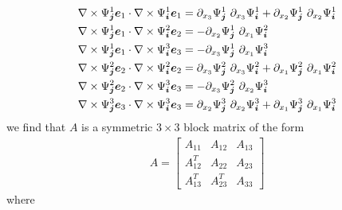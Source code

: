 \begin{align*}
 \nabla \times \Psi^{1}_{\bm{j}} \bm{e}_{1} \cdot \nabla \times \Psi^{1}_{\bm{i}} \bm{e}_{1} &=  
    \partial_{x_3} \Psi^{1}_{\bm{j}} ~ \partial_{x_3} \Psi^{1}_{\bm{i}} 
  + \partial_{x_2} \Psi^{1}_{\bm{j}} ~ \partial_{x_2} \Psi^{1}_{\bm{i}}
 \\
 \nabla \times \Psi^{1}_{\bm{j}} \bm{e}_{1} \cdot \nabla \times \Psi^{2}_{\bm{i}} \bm{e}_{2} &= 
 - \partial_{x_2} \Psi^{1}_{\bm{j}} ~ \partial_{x_1} \Psi^{2}_{\bm{i}}
 \\
 \nabla \times \Psi^{1}_{\bm{j}} \bm{e}_{1} \cdot \nabla \times \Psi^{3}_{\bm{i}} \bm{e}_{3} &=  
 - \partial_{x_3} \Psi^{1}_{\bm{j}} ~ \partial_{x_1} \Psi^{3}_{\bm{i}}
 \\
 \nabla \times \Psi^{2}_{\bm{j}} \bm{e}_{2} \cdot \nabla \times \Psi^{2}_{\bm{i}} \bm{e}_{2} &= 
   \partial_{x_3} \Psi^{2}_{\bm{j}} ~ \partial_{x_3} \Psi^{2}_{\bm{i}} 
 + \partial_{x_1} \Psi^{2}_{\bm{j}} ~ \partial_{x_1} \Psi^{2}_{\bm{i}}
 \\
 \nabla \times \Psi^{2}_{\bm{j}} \bm{e}_{2} \cdot \nabla \times \Psi^{3}_{\bm{i}} \bm{e}_{3} &=  
 - \partial_{x_3} \Psi^{2}_{\bm{j}} ~  \partial_{x_2} \Psi^{3}_{\bm{i}} 
 \\
 \nabla \times \Psi^{3}_{\bm{j}} \bm{e}_{3} \cdot \nabla \times \Psi^{3}_{\bm{i}} \bm{e}_{3} &=  
   \partial_{x_2} \Psi^{3}_{\bm{j}} ~ \partial_{x_2} \Psi^{3}_{\bm{i}} 
 + \partial_{x_1} \Psi^{3}_{\bm{j}} ~ \partial_{x_1} \Psi^{3}_{\bm{i}}
\end{align*}
we find that $A$ is a symmetric $3\times 3$ block matrix of the form
\begin{align}
  A = 
  \begin{bmatrix}
    A_{11}   & A_{12}   &  A_{13} \\
    A_{12}^T & A_{22}   &  A_{23} \\
    A_{13}^T & A_{23}^T &  A_{33} 
  \end{bmatrix}
\end{align}
where
